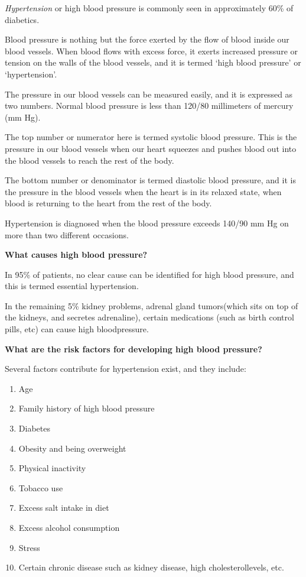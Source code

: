\textit{Hypertension} or high blood pressure is commonly seen in approximately 60\% of diabetics.

Blood pressure is nothing but the force exerted by the flow of blood inside our blood vessels. When blood flows with excess force, it exerts increased pressure or tension on the walls of the blood vessels, and it is termed ‘high blood pressure’ or ‘hypertension’.

The pressure in our blood vessels can be measured easily, and it is expressed as two numbers. Normal blood pressure is less than 120/80 millimeters of mercury (mm Hg).

The top number or numerator here is termed systolic blood pre\-ssure. This is the pressure in our blood vessels when our heart squeezes and pushes blood out into the blood vessels to reach the rest of the body.

The bottom number or denominator is termed diastolic blood pre\-ssure, and it is the pressure in the blood vessels when the heart is in its relaxed state, when blood is returning to the heart from the rest of the body.

Hypertension is diagnosed when the blood pressure exceeds 140/90 mm Hg on more than two different occasions.

\vskip 10pt
\noindent\textbf{What causes high blood pressure?}

In 95\% of patients, no clear cause can be identified for high blood pressure, and this is termed essential hypertension.

In the remaining 5\% kidney problems, adrenal gland tumors\break (which sits on top of the kidneys, and secretes adrenaline), certain medications (such as birth control pills, etc) can cause high blood\break pressure.

\vskip 10pt
\noindent\textbf{What are the risk factors for developing high blood pressure?}

\noindent Several factors contribute for hypertension exist, and they include:
\begin{enumerate}[•]
\itemsep=0pt
\item Age
\item Family history of high blood pressure
\item Diabetes
\item Obesity and being overweight
\item Physical inactivity
\item Tobacco use
\item Excess salt intake in diet
\item Excess alcohol consumption
\item Stress
\item Certain chronic disease such as kidney disease, high cholesterol\break levels, etc.
\end{enumerate}

